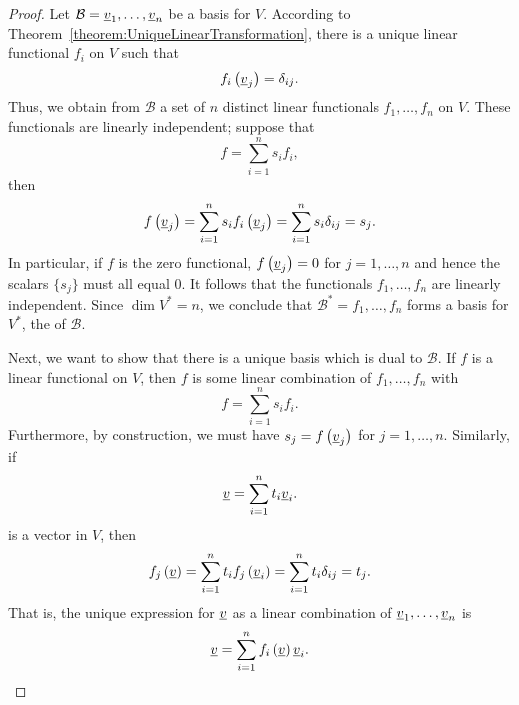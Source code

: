 \begin{proof}
Let $\mathcal{B} = \underline{v}_1, \ldots, \underline{v}_n$ be a basis for $V$.
According to Theorem~\ref{theorem:UniqueLinearTransformation}, there is a unique linear functional $f_i$ on $V$ such that
\begin{equation*}
f_i \left( \underline{v}_j \right) = \delta_{ij} .
\end{equation*}
Thus, we obtain from $\mathcal{B}$ a set of $n$ distinct linear functionals $f_1, \ldots, f_n$ on $V$.
These functionals are linearly independent;
suppose that
\begin{equation*}
f = \sum_{i=1}^n s_i f_i ,
\end{equation*}
then
\begin{equation*}
f \left( \underline{v}_j \right) = \sum_{i=1}^n s_i f_i \left( \underline{v}_j \right)
= \sum_{i=1}^n s_i \delta_{ij} = s_j .
\end{equation*}
In particular, if $f$ is the zero functional, $f \left( \underline{v}_j \right) = 0$ for $j = 1, \ldots, n$ and hence the scalars $\{ s_j \}$ must all equal $0$.
It follows that the functionals $f_1, \ldots, f_n$ are linearly independent.
Since $\dim V^* = n$, we conclude that $\mathcal{B}^* = f_1, \ldots, f_n$ forms a basis for $V^*$, the  of $\mathcal{B}$.

Next, we want to show that there is a unique basis which is dual to $\mathcal{B}$.
If $f$ is a linear functional on $V$, then $f$ is some linear combination of $f_1, \ldots, f_n$ with
\begin{equation*}
f = \sum_{i=1}^n s_i f_i .
\end{equation*}
Furthermore, by construction, we must have $s_j = f \left( \underline{v}_j \right)$ for $j = 1, \ldots, n$.
Similarly, if
\begin{equation*}
\underline{v} = \sum_{i=1}^n t_i \underline{v}_i .
\end{equation*}
is a vector in $V$, then
\begin{equation*}
f_j \left( \underline{v} \right) = \sum_{i=1}^n t_i f_j \left( \underline{v}_i \right)
= \sum_{i=1}^n t_i \delta_{ij} = t_j .
\end{equation*}
That is, the unique expression for $\underline{v}$ as a linear combination of $\underline{v}_1, \ldots, \underline{v}_n$ is
\begin{equation*}
\underline{v} = \sum_{i=1}^n f_i \left( \underline{v} \right) \underline{v}_i .
\end{equation*}
\end{proof}

